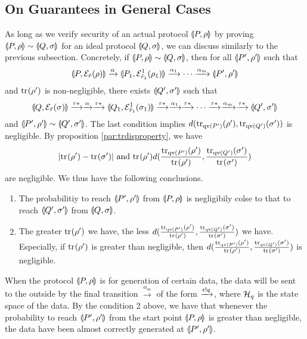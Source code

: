 \subsection{On Guarantees in General Cases}
As long as we verify security of an actual protocol $\llparenthesis P, \rho \rrparenthesis$ by
proving $\llparenthesis P, \rho \rrparenthesis \sim \llparenthesis Q, \sigma \rrparenthesis$ for an ideal protocol
$\llparenthesis Q, \sigma \rrparenthesis$, we can discuss similarly to the previous
subsection.
Concretely, if $\llparenthesis P, \rho \rrparenthesis \sim \llparenthesis Q, \sigma \rrparenthesis$, then
for all $\llparenthesis P', \rho' \rrparenthesis$ such that
\[
 \llparenthesis P, \mathcal{E}_{\tilde r}(\rho) \rrparenthesis \xrightarrow{\alpha} 
 \llparenthesis P_1, \mathcal{E}^1_{\tilde r_1}(\rho_1) \rrparenthesis \xrightarrow{\alpha_1} \cdots 
 \xrightarrow{\alpha_m} \llparenthesis P', \rho' \rrparenthesis
\]
and ${\rm tr}_{}(\rho')$ is non-negligible,
there exists $\llparenthesis Q', \sigma' \rrparenthesis$ such that
\[
 \llparenthesis Q, \mathcal{E}_{\tilde r}(\sigma) \rrparenthesis \xrightarrow{\tau*} \xrightarrow{\alpha} \xrightarrow{\tau*} 
 \llparenthesis Q_1, \mathcal{E}^1_{\tilde r_1}(\sigma_1) \rrparenthesis \xrightarrow{\tau*} \xrightarrow{\alpha_1} \xrightarrow{\tau*} \cdots 
 \xrightarrow{\tau*} \xrightarrow{\alpha_m} \xrightarrow{\tau*} \llparenthesis Q', \sigma' \rrparenthesis
\]
and $\llparenthesis P', \rho' \rrparenthesis \sim \llparenthesis Q', \sigma' \rrparenthesis$. 
The last condition implies $d({\rm tr}_{\mathrm{qv}(P')}(\rho'),
{\rm tr}_{\mathrm{qv}(Q')}(\sigma'))$ is negligible.
By proposition \ref{par:trdisproperty}, we have
$$|{\rm tr}_{}(\rho') - {\rm tr}_{}(\sigma')|
\mbox{ and } {\rm tr}_{}(\rho')d(\frac{{\rm tr}_{\mathrm{qv}(P')}(\rho')}{{\rm tr}_{}(\rho')},
\frac{{\rm tr}_{\mathrm{qv}(Q')}(\sigma')}{{\rm tr}_{}(\sigma')})$$
are negligible. 
 We thus have the following conclusions.
\begin{enumerate}
 \item The probabilitiy to reach $\llparenthesis P', \rho' \rrparenthesis$ from
       $\llparenthesis P, \rho \rrparenthesis$ is negligibily colse
       to that to reach $\llparenthesis Q', \sigma' \rrparenthesis$ from $\llparenthesis Q, \sigma \rrparenthesis$.
 \item The greater ${\rm tr}_{}(\rho')$ we have, the less 
       $d(\frac{{\rm tr}_{\mathrm{qv}(P')}(\rho')}{{\rm tr}_{}(\rho')},
       \frac{{\rm tr}_{\mathrm{qv}(Q')}(\sigma')}{{\rm tr}_{}(\sigma')})$ we have.
       Especially, if ${\rm tr}_{}(\rho')$ is greater than negligible,
       then $d(\frac{{\rm tr}_{\mathrm{qv}(P')}(\rho')}{{\rm tr}_{}(\rho')},
       \frac{{\rm tr}_{\mathrm{qv}(Q')}(\sigma')}{{\rm tr}_{}(\sigma')})$ is negligible.
\end{enumerate}
When the protocol $\llparenthesis P, \rho \rrparenthesis$ is for generation of certain data,
the data will be sent to the outside by the
final transition $\xrightarrow{\alpha_m}$ of the form
$\xrightarrow{\mathsf{c}! q}$,
where $\mathcal{H}_q$ is the state space of the data.
By the condition 2 above, we have that 
whenever the probability to reach $\llparenthesis P', \rho' \rrparenthesis$
from the start point $\llparenthesis P, \rho \rrparenthesis$ is greater than negligible,
the data have been almost correctly generated
at $\llparenthesis P', \rho' \rrparenthesis$.

